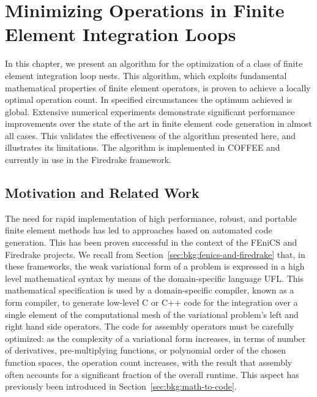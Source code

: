 
\chapter{Minimizing Operations in Finite Element Integration Loops}
\label{ch:optimality}

In this chapter, we present an algorithm for the optimization of a class of finite element integration loop nests. This algorithm, which exploits fundamental mathematical properties of finite element operators, is proven to achieve a locally optimal operation count. In specified circumstances the optimum achieved is global. Extensive numerical experiments demonstrate significant performance improvements over the state of the art in finite element code generation in almost all cases. This validates the effectiveness of the algorithm presented here, and illustrates its limitations. The algorithm is implemented in COFFEE and currently in use in the Firedrake framework.

\section{Motivation and Related Work}

The need for rapid implementation of high performance, robust, and portable finite element methods has led to approaches based on automated code generation. This has been proven successful in the context of the FEniCS  and Firedrake projects. We recall from Section~\ref{sec:bkg:fenics-and-firedrake} that, in these frameworks, the weak variational form of a problem is expressed in a high level mathematical syntax by means of the domain-specific language UFL. This mathematical specification is used by a domain-specific compiler, known as a form compiler, to generate low-level C or C++ code for the integration over a single element of the computational mesh of the variational problem's left and right hand side operators. The code for assembly operators must be carefully optimized: as the complexity of a variational form increases, in terms of number of derivatives, pre-multiplying functions, or polynomial order of the chosen function spaces, the operation count increases, with the result that assembly often accounts for a significant fraction of the overall runtime. This aspect has previously been introduced in Section~\ref{sec:bkg:math-to-code}.

